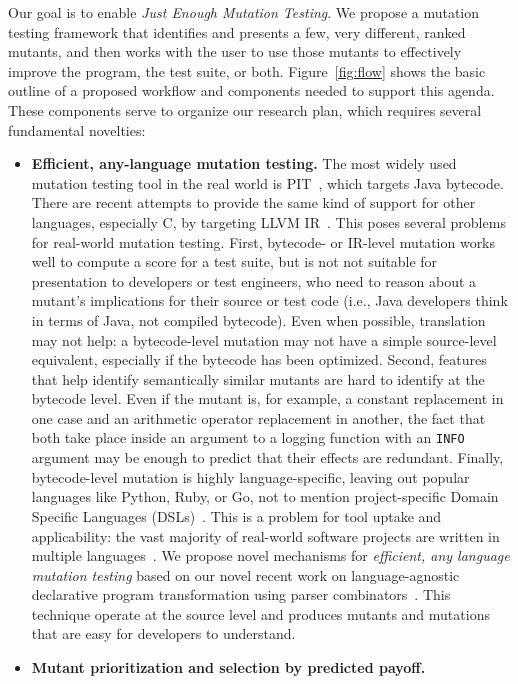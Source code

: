 Our goal is to enable \emph{Just Enough Mutation Testing}.  We propose a
mutation testing framework that identifies and presents a few, very different,
ranked mutants, and then works with the user to use those mutants to effectively
improve the program, the test suite, or both.  Figure~\ref{fig:flow}
 shows the basic outline of a proposed workflow
and components needed to support this agenda.  These components serve to
organize our research plan, which requires several fundamental novelties:
\begin{itemize}
\item \textbf{Efficient, any-language mutation testing.}  The most widely used
  mutation testing tool in the real world is PIT~\cite{pittest}, which targets
  Java bytecode.  There are recent attempts to provide the same kind of support
  for other languages, especially C, by targeting LLVM IR~\cite{HaririLLVM}.
  This poses several problems for real-world mutation testing.  First, bytecode-
  or IR-level mutation works well to compute a score for a test suite, but is
  not not suitable for presentation to developers or test engineers, who need to
  reason about a mutant's implications for their source or test code (i.e., Java
  developers think in terms of Java, not compiled bytecode).  Even when
  possible, translation may not help: a bytecode-level mutation may not have a
  simple source-level equivalent, especially if the bytecode has been optimized.
  Second, features that help identify semantically similar mutants are hard to
  identify at the bytecode level.  Even if the mutant is, for example, a
  constant replacement in one case and an arithmetic operator replacement in
  another, the fact that both take place inside an argument to a logging
  function with an {\tt INFO} argument may be enough to predict that their
  effects are redundant.  Finally, bytecode-level mutation is highly
  language-specific, leaving out popular languages like Python, Ruby, or Go, not
  to mention project-specific Domain Specific Languages (DSLs)~\cite{Fow10}.
  This is a problem for tool uptake and applicability: the vast majority of
  real-world software projects are written in multiple languages~\cite{Ray2014}.
  We propose novel mechanisms for \emph{efficient, any language mutation
    testing} based on our novel recent work on language-agnostic declarative
  program transformation using parser combinators~\cite{rvt-ppc}.  This
  technique operate at the source level and produces mutants and mutations that
  are easy for developers to understand. 
\item \textbf{Mutant prioritization and selection by predicted payoff.}

\end{itemize}
